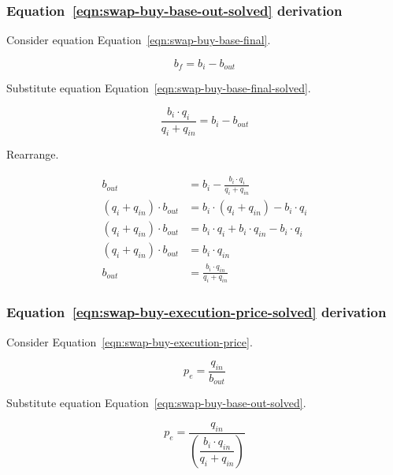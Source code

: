 \documentclass[table, twocolumn]{article}
\begin{document}
\subsubsection{Equation~\ref{eqn:swap-buy-base-out-solved} derivation}%
\label{sssec:equation-eqn-swap-buy-base-out-solved-derivation}

Consider equation Equation~\ref{eqn:swap-buy-base-final}.

\begin{equation}
	b_f = b_i - b_{out} \nonumber
\end{equation}

Substitute equation Equation~\ref{eqn:swap-buy-base-final-solved}.

\begin{equation}
	\frac{b_i \cdot q_i}{q_i + q_{in}} = b_i - b_{out} \nonumber
\end{equation}

Rearrange.

\begin{align}
	b_{out}                      & = b_i - \frac{b_i \cdot q_i}{q_i + q_{in}} \nonumber \\
	(q_i + q_{in}) \cdot b_{out} & = b_i \cdot (q_i + q_{in})- b_i \cdot q_i \nonumber  \\
	(q_i + q_{in}) \cdot b_{out} & =
	b_i \cdot q_i + b_i \cdot q_{in} - b_i \cdot q_i \nonumber                          \\
	(q_i + q_{in}) \cdot b_{out} & = b_i \cdot q_{in} \nonumber                         \\
	b_{out}                      & = \frac{b_i \cdot q_{in}}{q_i + q_{in}} \nonumber
\end{align}

\subsubsection{Equation~\ref{eqn:swap-buy-execution-price-solved} derivation}%
\label{sssec:equation-eqn-swap-buy-execution-price-solved-derivation}

Consider Equation~\ref{eqn:swap-buy-execution-price}.

\begin{equation}
	p_e = \frac{q_{in}}{b_{out}} \nonumber
\end{equation}

Substitute equation Equation~\ref{eqn:swap-buy-base-out-solved}.

\begin{equation}
	p_e = \frac{q_{in}}{\left(\dfrac{b_i \cdot q_{in}}{q_i + q_{in}}\right)} \nonumber
\end{equation}
\end{document}
